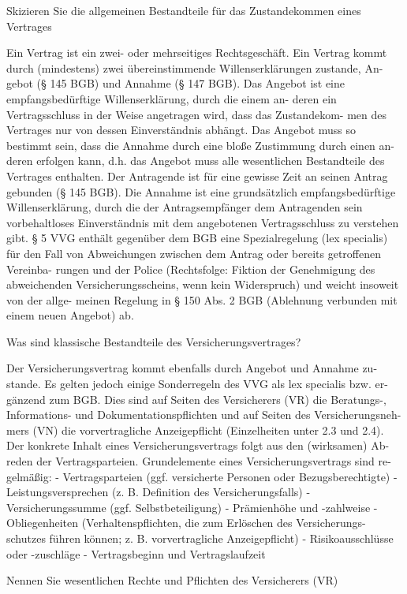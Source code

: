 Skizieren Sie die allgemeinen Bestandteile für das Zustandekommen eines Vertrages

Ein Vertrag ist ein zwei- oder mehrseitiges Rechtsgeschäft. Ein Vertrag kommt
durch (mindestens) zwei übereinstimmende Willenserklärungen zustande, An-
gebot (§ 145 BGB) und Annahme (§ 147 BGB).
Das Angebot ist eine empfangsbedürftige Willenserklärung, durch die einem an-
deren ein Vertragsschluss in der Weise angetragen wird, dass das Zustandekom-
men des Vertrages nur von dessen Einverständnis abhängt. Das Angebot muss so
bestimmt sein, dass die Annahme durch eine bloße Zustimmung durch einen an-
deren erfolgen kann, d.h. das Angebot muss alle wesentlichen Bestandteile des
Vertrages enthalten. Der Antragende ist für eine gewisse Zeit an seinen Antrag
gebunden (§ 145 BGB).
Die Annahme ist eine grundsätzlich empfangsbedürftige Willenserklärung, durch
die der Antragsempfänger dem Antragenden sein vorbehaltloses Einverständnis
mit dem angebotenen Vertragsschluss zu verstehen gibt.
§ 5 VVG enthält gegenüber dem BGB eine Spezialregelung (lex specialis) für den
Fall von Abweichungen zwischen dem Antrag oder bereits getroffenen Vereinba-
rungen und der Police (Rechtsfolge: Fiktion der Genehmigung des abweichenden
Versicherungsscheins, wenn kein Widerspruch) und weicht insoweit von der allge-
meinen Regelung in § 150 Abs. 2 BGB (Ablehnung verbunden mit einem neuen
Angebot) ab.

Was sind klassische Bestandteile des Versicherungsvertrages?

Der Versicherungsvertrag kommt ebenfalls durch Angebot und Annahme zu-
stande. Es gelten jedoch einige Sonderregeln des VVG als lex specialis bzw. er-
gänzend zum BGB. Dies sind auf Seiten des Versicherers (VR) die Beratungs-,
Informations- und Dokumentationspflichten und auf Seiten des Versicherungsneh-
mers (VN) die vorvertragliche Anzeigepflicht (Einzelheiten unter 2.3 und 2.4).
Der konkrete Inhalt eines Versicherungsvertrags folgt aus den (wirksamen) Ab-
reden der Vertragsparteien. Grundelemente eines Versicherungsvertrags sind re-
gelmäßig:
- Vertragsparteien (ggf. versicherte Personen oder Bezugsberechtigte)
- Leistungsversprechen (z. B. Definition des Versicherungsfalls)
- Versicherungssumme (ggf. Selbstbeteiligung)
- Prämienhöhe und -zahlweise
- Obliegenheiten (Verhaltenspflichten, die zum Erlöschen des Versicherungs-
schutzes führen können; z. B. vorvertragliche Anzeigepflicht)
- Risikoausschlüsse oder -zuschläge
- Vertragsbeginn und Vertragslaufzeit


Nennen Sie wesentlichen Rechte und Pflichten des Versicherers (VR)

